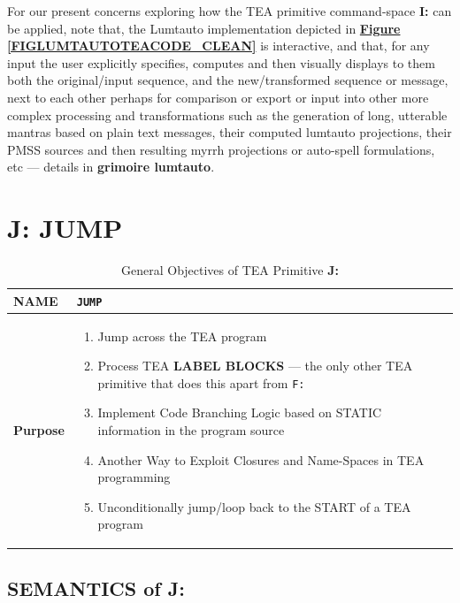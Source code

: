 \documentclass[a4paper, 18pt]{book} %
\begin{document}
For our present concerns exploring how the TEA primitive command-space \textbf{I:} can be applied, note that, the Lumtauto implementation depicted in \textbf{\hyperref[FIGLUMTAUTOTEACODE_CLEAN]{Figure \ref{FIGLUMTAUTOTEACODE_CLEAN}}} is interactive, and that, for any input the user explicitly specifies, computes and then visually displays to them both the original/input sequence, and the new/transformed sequence or message, next to each other perhaps for comparison or export or input into other more complex processing and transformations such as the generation of long, utterable mantras based on plain text messages, their computed lumtauto projections, their PMSS sources and then resulting myrrh projections or auto-spell formulations, etc --- details in \textbf{grimoire lumtauto}\cite{lutalo_2025_grimlumtauto}.




\chapter{J: JUMP}
\label{CHAPJ}


\begin{table}[H]
  \centering
  \LARGE
	\begin{tabular}[t]{|p{}|p{}}
 
	\textbf{NAME} & \texttt{JUMP}\\
	\hline
	\textbf{Purpose} & \begin{enumerate}
	\item Jump across the TEA program
	\item Process TEA \textbf{LABEL BLOCKS} --- {\small the only other TEA primitive that does this apart from \texttt{F:}}
	\item Implement Code Branching Logic based on STATIC information in the program source
	\item Another Way to Exploit Closures and Name-Spaces in TEA programming
	\item Unconditionally jump/loop back to the START of a TEA program
	\end{enumerate}\\
	\hline
	              
\end{tabular}
\caption{General Objectives of TEA Primitive \textbf{J:}}
  \label{TABTAZJ}
\end{table}


\section{SEMANTICS of J:}
\label{SECSEMJ}
\end{document}
